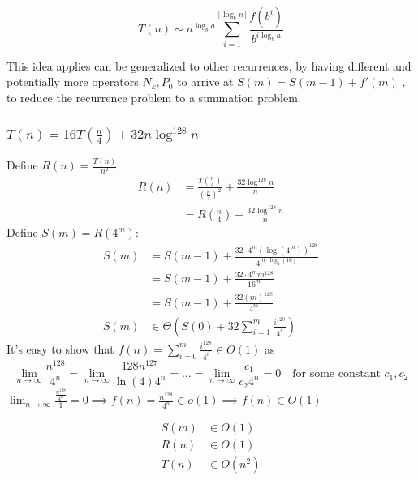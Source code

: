 \documentclass[9pt]{extarticle}
\begin{document}
\[T(n) \sim n^{\log_ba} \sum_{i=1}^{\lfloor \log_b n\rfloor}\frac{f(b^i)}{b^{i\log_b a}}\]

This idea applies can be generalized to other recurrences, by having different and potentially more operators $N_k, P_0$ to arrive at $S(m) = S(m-1) + f'(m)$
, to reduce the recurrence problem to a summation problem.
\subsubsection{$T(n) = 16T(\frac{n}{4}) + 32n\log^{128}n$}
Define $R(n) = \frac{T(n)}{n^2}$:
\begin{align*}
    R(n) &= \frac{T(\frac{n}{4})}{(\frac{n}{4})^2} + \frac{32\log^{128}n}{n}\\
    &= R(\frac{n}{4}) + \frac{32\log^{128}n}{n}
\end{align*}
Define $S(m) = R(4^m)$:
\begin{align*}
    S(m) &= S(m - 1) + \frac{32 \cdot 4^m (\log(4^m))^{128}}{4^{m \cdot \log_4(16)}}\\
    &= S(m -1) + \frac{32\cdot 4^m m^{128}}{16^m}\\
    &= S(m-1) + \frac{32(m)^{128}}{4^m}\\
    S(m) &\in \Theta(S(0) + 32\sum_{i=1}^{m} \frac{i^{128}}{4^i})
\end{align*}
It's easy to show that $f(n) = \sum_{i=0}^{m}\frac{i^{128}}{4^i} \in O(1)$ as 
\[\lim_{n\rightarrow \infty} \frac{n^{128}}{4^n} = \lim_{n\rightarrow \infty} \frac{128 n^{127}}{\ln(4) 4^n} 
= \dots = \lim_{n \rightarrow \infty} \frac{c_1 }{c_2 4^n} = 0\quad \text{for some constant } c_1, c_2\]
$\lim_{n \rightarrow \infty} \frac{\frac{n^{128}}{4^n}}{1} = 0 \implies f(n) = \frac{n^{128}}{4^n} \in o(1) \implies f(n) \in O(1)$

\begin{align*}
    S(m) &\in O(1)\\
    R(n) &\in O(1)\\
    T(n) &\in O(n^2)
\end{align*}
\end{document}
